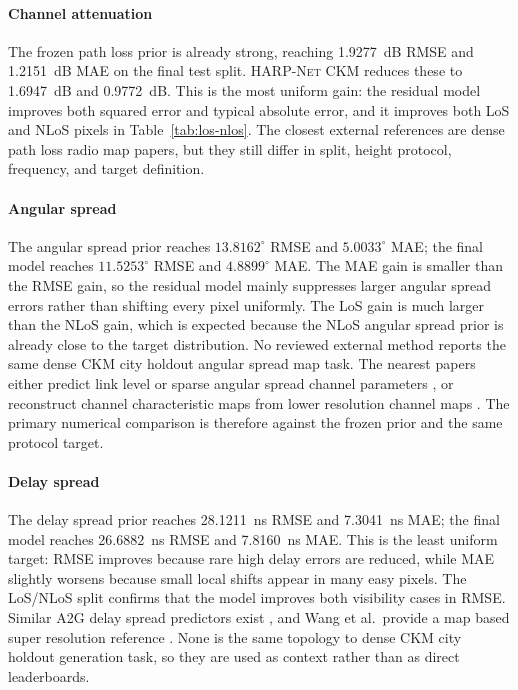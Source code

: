 \documentclass[journal]{IEEEtran}
\begin{document}
\paragraph{Channel attenuation}
The frozen path loss prior is already strong, reaching \SI{1.9277}{dB} RMSE
and \SI{1.2151}{dB} MAE on the final test split. \textsc{HARP-Net CKM}
reduces these to \SI{1.6947}{dB} and \SI{0.9772}{dB}. This is the most
uniform gain: the residual model improves both squared error and typical
absolute error, and it improves both LoS and NLoS pixels in
Table~\ref{tab:los-nlos}. The closest external references are dense path loss
radio map papers, but they still differ in split, height protocol, frequency,
and target definition.

\paragraph{Angular spread}
The angular spread prior reaches \(13.8162^\circ\) RMSE and \(5.0033^\circ\)
MAE; the final model reaches \(11.5253^\circ\) RMSE and \(4.8899^\circ\) MAE.
The MAE gain is smaller than the RMSE gain, so the residual model mainly suppresses larger angular
spread errors rather than shifting every pixel uniformly. The LoS gain is much
larger than the NLoS gain, which is expected because the NLoS angular spread
prior is already close to the target distribution. No reviewed external method
reports the same dense CKM city holdout angular spread map task. The nearest
papers either predict link level or sparse angular spread channel parameters
\cite{huang2025a2gtransformer,mi2024pointcloud}, or reconstruct channel
characteristic maps from lower resolution channel maps
\cite{wang2023multitasksr}. The primary numerical comparison is therefore
against the frozen prior and the same protocol target.

\paragraph{Delay spread}
The delay spread prior reaches \SI{28.1211}{ns} RMSE and \SI{7.3041}{ns} MAE;
the final model reaches \SI{26.6882}{ns} RMSE and \SI{7.8160}{ns} MAE. This
is the least uniform target: RMSE improves because rare high delay errors are
reduced, while MAE slightly worsens because small local shifts appear in many
easy pixels. The LoS/NLoS split confirms that the model improves both
visibility cases in RMSE. Similar A2G delay spread predictors exist
\cite{yang2019a2gml,huang2025a2gtransformer}, and Wang et al.\ provide a
map based super resolution reference \cite{wang2023multitasksr}. None is the
same topology to dense CKM city holdout generation task, so they are used as
context rather than as direct leaderboards.
\end{document}
